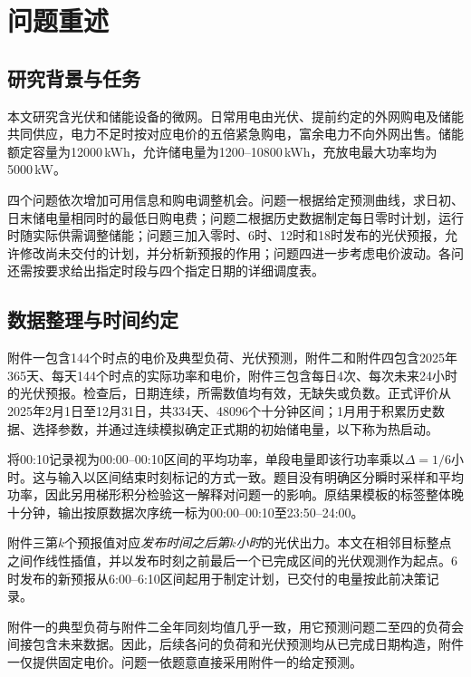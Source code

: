\section{问题重述}
\subsection{研究背景与任务}
本文研究含光伏和储能设备的微网。日常用电由光伏、提前约定的外网购电及储能共同供应，电力不足时按对应电价的五倍紧急购电，富余电力不向外网出售。储能额定容量为12000\,kWh，允许储电量为1200--10800\,kWh，充放电最大功率均为5000\,kW。

四个问题依次增加可用信息和购电调整机会。问题一根据给定预测曲线，求日初、日末储电量相同时的最低日购电费；问题二根据历史数据制定每日零时计划，运行时随实际供需调整储能；问题三加入零时、6时、12时和18时发布的光伏预报，允许修改尚未交付的计划，并分析新预报的作用；问题四进一步考虑电价波动。各问还需按要求给出指定时段与四个指定日期的详细调度表。

\subsection{数据整理与时间约定}
附件一包含144个时点的电价及典型负荷、光伏预测，附件二和附件四包含2025年365天、每天144个时点的实际功率和电价，附件三包含每日4次、每次未来24小时的光伏预报。检查后，日期连续，所需数值均有效，无缺失或负数。正式评价从2025年2月1日至12月31日，共334天、48096个十分钟区间；1月用于积累历史数据、选择参数，并通过连续模拟确定正式期的初始储电量，以下称为热启动。

将00:10记录视为00:00--00:10区间的平均功率，单段电量即该行功率乘以$\Delta=1/6$小时。这与输入以区间结束时刻标记的方式一致。题目没有明确区分瞬时采样和平均功率，因此另用梯形积分检验这一解释对问题一的影响。原结果模板的标签整体晚十分钟，输出按原数据次序统一标为00:00--00:10至23:50--24:00。

附件三第$k$个预报值对应\emph{发布时间之后第$k$小时}的光伏出力。本文在相邻目标整点之间作线性插值，并以发布时刻之前最后一个已完成区间的光伏观测作为起点。6时发布的新预报从6:00--6:10区间起用于制定计划，已交付的电量按此前决策记录。

附件一的典型负荷与附件二全年同刻均值几乎一致，用它预测问题二至四的负荷会间接包含未来数据。因此，后续各问的负荷和光伏预测均从已完成日期构造，附件一仅提供固定电价。问题一依题意直接采用附件一的给定预测。
